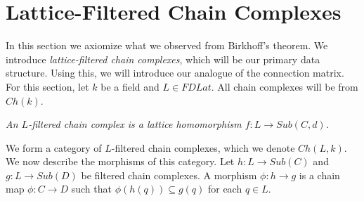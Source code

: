 %
%
%
%
%
%

\section{Lattice-Filtered Chain Complexes}\label{sec:cf}

In this section we axiomize what we observed from Birkhoff's theorem.  We introduce {\em lattice-filtered chain complexes}, which will be our primary data structure.   Using this, we will introduce our analogue of the connection matrix.  For this section, let $k$ be a field and $L\in FDLat$.  All chain complexes will be from $Ch(k)$.

\begin{defn}
{\em
An {\em $L$-filtered chain complex} is a lattice homomorphism $f:L\to Sub(C,d)$.
}
\end{defn}

We form a category of $L$-filtered chain complexes, which we denote $Ch(L,k)$.  We now describe the morphisms of this category.   Let $h:L\to Sub(C)$ and $g:L\to Sub(D)$ be filtered chain complexes.  A morphism $\phi:h\to g$ is a chain map $\phi:C\to D$ such that $\phi(h(q))\subseteq g(q)$ for each $q\in L$.

